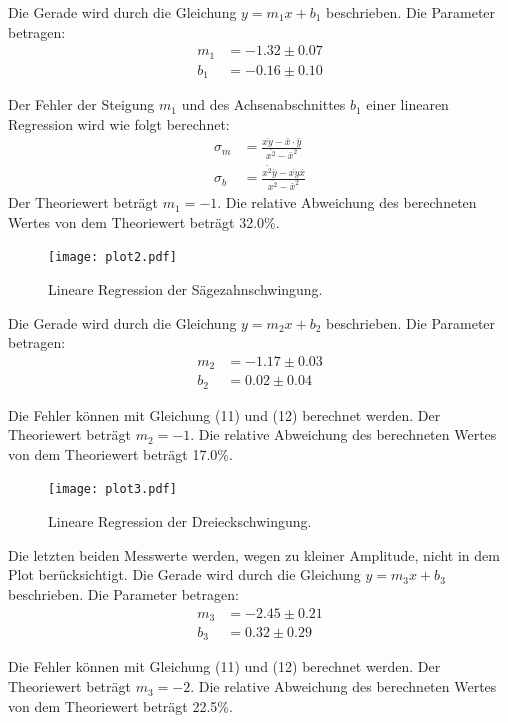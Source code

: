 Die Gerade wird durch die Gleichung $y = m_1x + b_1$ beschrieben. Die Parameter betragen:
\begin{align*}
  m_1 &= -1.32 \pm 0.07 \\
  b_1 &= -0.16 \pm 0.10
\end{align*}

Der Fehler der Steigung $m_1$ und des Achsenabschnittes $b_1$ einer linearen Regression
wird wie folgt berechnet:
\begin{align}
  \sigma_m &= \frac{\overline{xy}-\bar{x}\cdot\bar{y}}{\bar{x^2}-\bar{x}^2} \\
  \sigma_b &= \frac{\bar{x^2}\bar{y}-\overline{xy}\bar{x}}{\bar{x^2}-\bar{x}^2}
\end{align}
Der Theoriewert beträgt $m_1=-1$. Die relative Abweichung des berechneten Wertes von dem Theoriewert beträgt 32.0\%.

\begin{figure}
  \centering
  \texttt{[image: plot2.pdf]}
  \caption{Lineare Regression der Sägezahnschwingung.}
  \label{fig:saegezahn}
\end{figure}

Die Gerade wird durch die Gleichung $y = m_2x + b_2$ beschrieben. Die Parameter betragen:
\begin{align*}
  m_2 &= -1.17 \pm 0.03 \\
  b_2 &= 0.02 \pm 0.04
\end{align*}

Die Fehler können mit Gleichung (11) und (12) berechnet werden.
Der Theoriewert beträgt $m_2=-1$. Die relative Abweichung des berechneten Wertes von dem Theoriewert beträgt 17.0\%.

\begin{figure}[H]
  \centering
  \texttt{[image: plot3.pdf]}
  \caption{Lineare Regression der Dreieckschwingung.}
  \label{fig:dreieck}
\end{figure}

Die letzten beiden Messwerte werden, wegen zu kleiner Amplitude, nicht in dem Plot berücksichtigt.
Die Gerade wird durch die Gleichung $y = m_3x + b_3$ beschrieben. Die Parameter betragen:
\begin{align*}
  m_3 &= -2.45 \pm 0.21 \\
  b_3 &= 0.32 \pm 0.29
\end{align*}

Die Fehler können mit Gleichung (11) und (12) berechnet werden.
Der Theoriewert beträgt $m_3=-2$. Die relative Abweichung des berechneten Wertes von dem Theoriewert beträgt 22.5\%.

